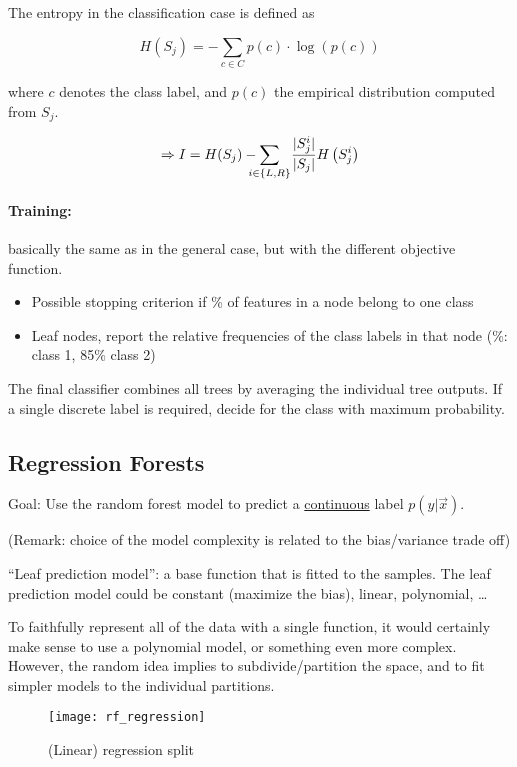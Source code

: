 The entropy in the classification case is defined as

\[H(S_j) = -\sum_{c \in C} p(c) \cdot \log(p(c))\]

where \(c\) denotes the class label, and \(p(c)\) the empirical distribution computed from \(S_j\).

\[\Rightarrow I = H(S_j) - \sum_{\mathclap{i \in \{L,R\}}}\ \ \frac{|S^i_j|}{|S_j|} H\left(S^i_j\right)\]

\paragraph{Training:} basically the same as in the general case, but with the different objective function.
\begin{itemize}
    \item Possible stopping criterion if \% of features in a node belong to one class
    \item Leaf nodes, report the relative frequencies of the class labels in that node (\%: class 1, 85\% class 2)
\end{itemize}

The final classifier combines all trees by averaging the individual tree outputs. If a single discrete label is required, decide for the class with maximum probability.


\subsection{Regression Forests}
Goal: Use the random forest model to predict a \underline{continuous} label \(p(y|\vec{x})\).

(Remark: choice of the model complexity is related to the bias/variance trade off)

``Leaf prediction model'': a base function that is fitted to the samples. The leaf prediction model could be constant (maximize the bias), linear, polynomial, \dots

To faithfully represent all of the data with a single function, it would certainly make sense to use a polynomial model, or something even more complex. However, the random idea implies to subdivide/partition the space, and to fit simpler models to the individual partitions.

\begin{figure}[H]
	\centering
  \texttt{[image: rf\_regression]}
	\caption{ (Linear) regression split}
\end{figure}

